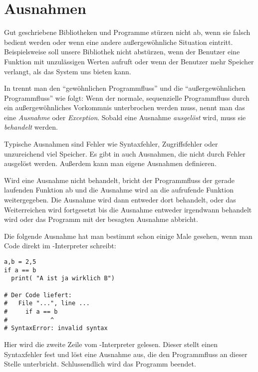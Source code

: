 \section{Ausnahmen}
\label{section:ausnahmen}
Gut geschriebene Bibliotheken und Programme stürzen nicht ab, wenn sie falsch bedient werden oder
wenn eine andere außergewöhnliche Situation eintritt.
Beispielsweise soll unsere  Bibliothek nicht abstürzen, wenn der Benutzer eine Funktion mit unzulässigen Werten aufruft oder
wenn der Benutzer mehr Speicher verlangt, als das System uns bieten kann.

In \Python trennt man den ``gewöhnlichen Programmfluss'' und die ``außer\-ge\-wöhn\-lich\-en Programmfluss'' wie folgt:
Wenn der normale, sequenzielle Programmfluss durch ein außergewöhnliches Vorkommnis unterbrochen werden muss, nennt man das eine \emph{Ausnahme} oder \emph{Exception}.
Sobald eine Ausnahme \emph{ausgelöst} wird, muss sie \emph{behandelt} werden.

Typische Ausnahmen sind Fehler wie Syntaxfehler, Zugriffsfehler oder unzureichend viel Speicher.
Es gibt in \Python auch Ausnahmen, die nicht durch Fehler ausgelöst werden.
Außerdem kann man eigene Ausnahmen definieren.

Wird eine Ausnahme nicht behandelt, bricht der Programmfluss der gerade laufenden Funktion ab und die Ausnahme wird an die aufrufende Funktion weitergegeben.
Die Ausnahme wird dann entweder dort behandelt, oder das Weiterreichen wird fortgesetzt bis die Ausnahme entweder irgendwann behandelt wird oder das Programm mit der besagten Ausnahme abbricht.

Die folgende Ausnahme hat man bestimmt schon einige Male gesehen, wenn man Code direkt im \Python-Interpreter schreibt:
\begin{lstlisting}
a,b = 2,5
if a == b
  print( "A ist ja wirklich B")

# Der Code liefert:
#   File "...", line ...
#     if a == b
#            ^
# SyntaxError: invalid syntax
\end{lstlisting}
Hier wird die zweite Zeile vom \Python-Interpreter gelesen.
Dieser stellt einen Syntaxfehler fest und löst eine Ausnahme aus, die den Programmfluss an dieser Stelle unterbricht.
Schlussendlich wird das Programm beendet.




